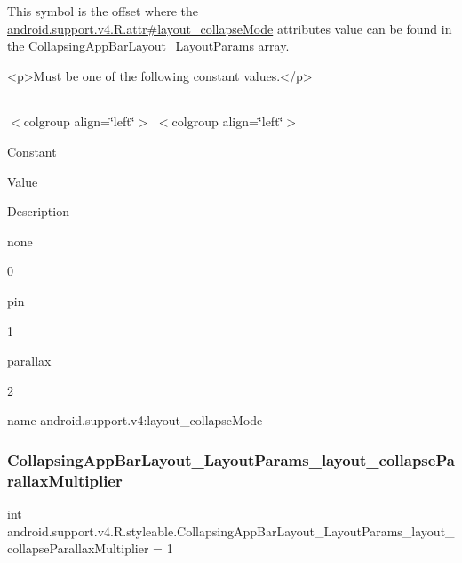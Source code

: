 This symbol is the offset where the \hyperlink{classandroid_1_1support_1_1v4_1_1R_1_1attr_aa4465fd35e82a6ccfec13236de2e46fc}{android.\+support.\+v4.\+R.\+attr\#layout\+\_\+collapse\+Mode} attribute\textquotesingle{}s value can be found in the \hyperlink{classandroid_1_1support_1_1v4_1_1R_1_1styleable_a0696d62845b5e876d66afb6909f133af}{Collapsing\+App\+Bar\+Layout\+\_\+\+Layout\+Params} array.

\begin{DoxyVerb}      <p>Must be one of the following constant values.</p>
\end{DoxyVerb}
 \tabulinesep=1mm
\begin{longtabu} spread 0pt [c]{*{0}{|X[-1]}|}
\hline
\end{longtabu}
$<$colgroup align=\char`\"{}left\char`\"{}$>$ $<$colgroup align=\char`\"{}left\char`\"{}$>$ 

Constant

Value

Description 

{\ttfamily none}

0

{\ttfamily pin}

1

{\ttfamily parallax}

2

name android.\+support.\+v4\+:layout\+\_\+collapse\+Mode \mbox{\label{classandroid_1_1support_1_1v4_1_1R_1_1styleable_afdc4be27d8e580fe8002a2351e0ed781}} 
\subsubsection{\texorpdfstring{Collapsing\+App\+Bar\+Layout\+\_\+\+Layout\+Params\+\_\+layout\+\_\+collapse\+Parallax\+Multiplier}{CollapsingAppBarLayout\_LayoutParams\_layout\_collapseParallaxMultiplier}}
{\footnotesize\ttfamily int android.\+support.\+v4.\+R.\+styleable.\+Collapsing\+App\+Bar\+Layout\+\_\+\+Layout\+Params\+\_\+layout\+\_\+collapse\+Parallax\+Multiplier = 1\hspace{0.3cm}{\ttfamily [static]}}

